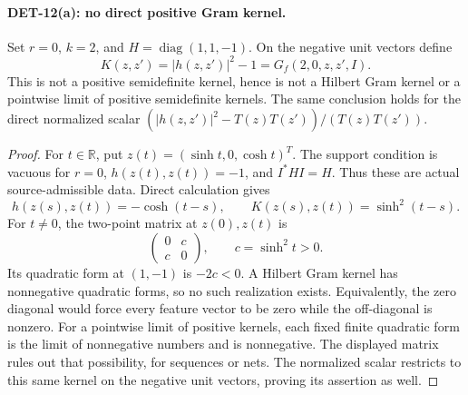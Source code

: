\paragraph{DET-12(a): no direct positive Gram kernel.}
Set \(r=0\), \(k=2\), and \(H=\operatorname{diag}(1,1,-1)\).
On the negative unit vectors define
\[
 K(z,z')=|h(z,z')|^2-1=G_f(2,0,z,z',I).
\]
This is not a positive semidefinite kernel, hence is not a Hilbert Gram
kernel or a pointwise limit of positive semidefinite kernels.
The same conclusion holds for the direct normalized scalar
\((|h(z,z')|^2-T(z)T(z'))/(T(z)T(z'))\).
\begin{proof}
For \(t\in\mathbb R\), put \(z(t)=(\sinh t,0,\cosh t)^T\).
The support condition is vacuous for \(r=0\),
\(h(z(t),z(t))=-1\), and \(I^*HI=H\). Thus these are actual
source-admissible data. Direct calculation gives
\[
 h(z(s),z(t))=-\cosh(t-s),\qquad
 K(z(s),z(t))=\sinh^2(t-s).
\]
For \(t\ne0\), the two-point matrix at \(z(0),z(t)\) is
\[
 \begin{pmatrix}0&c\\c&0\end{pmatrix},\qquad c=\sinh^2t>0.
\]
Its quadratic form at \((1,-1)\) is \(-2c<0\).
A Hilbert Gram kernel has nonnegative quadratic forms, so no such
realization exists. Equivalently, the zero diagonal would force every
feature vector to be zero while the off-diagonal is nonzero.
For a pointwise limit of positive kernels, each fixed finite quadratic
form is the limit of nonnegative numbers and is nonnegative.
The displayed matrix rules out that possibility, for sequences or nets.
The normalized scalar restricts to this same kernel on the negative
unit vectors, proving its assertion as well.
\end{proof}


